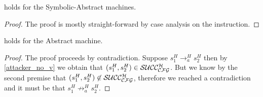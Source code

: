 \begin{lemma}
  \label{cfg_equiv_SA}
   holds for the Symbolic-Abstract machines.
\end{lemma}
\begin{proof}
  The proof is mostly straight-forward by case analysis on the
  instruction.
\end{proof}

\begin{lemma}
  \label{av_no_attacker_A}
   holds for the Abstract machine.
\end{lemma}
\begin{proof}
  The proof proceeds by contradiction.
  Suppose $s^H_1 \to^H_a s^H_2$ then by \cref{attacker_no_v}
  we obtain that $(s^H_1,s^H_2) \in \mathcal{SUCC_\mathcal{CFG}^{H}}$. But we know
  by the second premise that $(s^H_1,s^H_2) \not \in \mathcal{SUCC_\mathcal{CFG}^{H}}$,
  therefore we reached a contradiction and it must be that
  $s^H_1 \not \to^H_a s^H_2$.
\end{proof}


